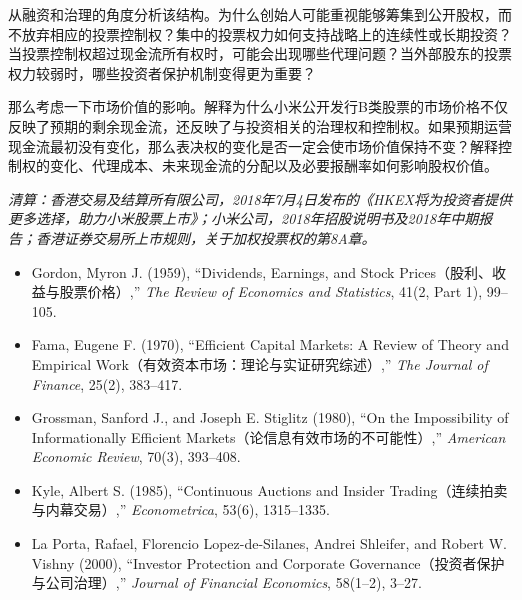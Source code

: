 从融资和治理的角度分析该结构。为什么创始人可能重视能够筹集到公开股权，而不放弃相应的投票控制权？集中的投票权力如何支持战略上的连续性或长期投资？当投票控制权超过现金流所有权时，可能会出现哪些代理问题？当外部股东的投票权力较弱时，哪些投资者保护机制变得更为重要？

那么考虑一下市场价值的影响。解释为什么小米公开发行B类股票的市场价格不仅反映了预期的剩余现金流，还反映了与投资相关的治理权和控制权。如果预期运营现金流最初没有变化，那么表决权的变化是否一定会使市场价值保持不变？解释控制权的变化、代理成本、未来现金流的分配以及必要报酬率如何影响股权价值。

\emph{清算：香港交易及结算所有限公司，2018年7月4日发布的《HKEX将为投资者提供更多选择，助力小米股票上市》；小米公司，2018年招股说明书及2018年中期报告；香港证券交易所上市规则，关于加权投票权的第8A章。}



\begin{itemize}

\item Gordon, Myron J. (1959),
``Dividends, Earnings, and Stock Prices（股利、收益与股票价格）,''
\emph{The Review of Economics and Statistics}, 41(2, Part 1), 99--105.

\item Fama, Eugene F. (1970),
``Efficient Capital Markets: A Review of Theory and Empirical Work（有效资本市场：理论与实证研究综述）,''
\emph{The Journal of Finance}, 25(2), 383--417.

\item Grossman, Sanford J., and Joseph E. Stiglitz (1980),
``On the Impossibility of Informationally Efficient Markets（论信息有效市场的不可能性）,''
\emph{American Economic Review}, 70(3), 393--408.

\item Kyle, Albert S. (1985),
``Continuous Auctions and Insider Trading（连续拍卖与内幕交易）,''
\emph{Econometrica}, 53(6), 1315--1335.

\item La Porta, Rafael, Florencio Lopez-de-Silanes, Andrei Shleifer, and Robert W. Vishny (2000),
``Investor Protection and Corporate Governance（投资者保护与公司治理）,''
\emph{Journal of Financial Economics}, 58(1--2), 3--27.

\end{itemize}

